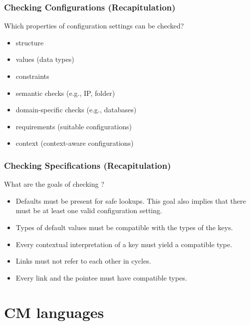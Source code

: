 \begin{frame}
	\frametitle{Checking Configurations (Recapitulation)}

	\begin{task}
	Which properties of configuration settings can be checked?
	\end{task}

	\pause

	\begin{itemize} %
	\item structure
	\item values (data types)
	\item constraints
	\item semantic checks (e.g., IP, folder)
	\item domain-specific checks (e.g., databases)
	\item requirements (suitable configurations)
	\item context (context-aware configurations)
	\end{itemize}
\end{frame}

\begin{frame}
	\frametitle{Checking Specifications (Recapitulation)}

	\begin{task}
	What are the goals of checking ?
	\end{task}

	\pause

	\begin{itemize} %
	\item Defaults must be present for safe lookups.
	This goal also implies that there must be at least one valid configuration setting.
	\item Types of default values must be compatible with the types of the keys.
	\item Every contextual interpretation of a key must yield a compatible type.
	\item Links must not refer to each other in cycles.
	\item Every link and the pointee must have compatible types.
	\end{itemize}
\end{frame}

\section{CM languages}

